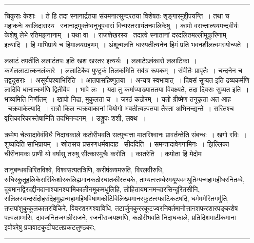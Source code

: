 \documentclass[11pt, openany]{book}
\begin{document}
\vspace{2mm}
\hrule

\noindent
{\s चिकुराः केशाः~। ते हि तदा स्नानार्द्रतया संयमनात्सुन्दरतया विशेषतः शृङ्गारमुद्दीपयन्ति~। तथा च महाकनेः कालिदासस्य \textendash\ {\qt स्नानाद्रमुक्तेष्वनुधूपवासं विन्यस्तसायंतनमलिकेषु}~। कामो वसन्तात्ययमन्दवीर्यः केशेषु लेभे रतिमझनानाम्~॥ यथा वा~। राजशेखरस्य \textendash\ {\qt तदात्वे स्नातानां दरदलितमल्लीमुकुरिणाम्} इत्यादि~। हि माभिप्राये च हिमालयग्रहणम्~। अंशून्मलति धारयतीत्यनेन हिमं प्रति भवनशीलत्वमस्योच्यते~।

ललाटं तपतीति ललाटंतपः इति खश खरतर इत्यर्थः~। ललाटेऽलंकारो ललाटिका~। {\qt कर्णललाटात्कनलंकारे}~। ललाटिकैव पुण्ट्रकं तिलकमिति सर्वत्र रूपकम्~। संवीतैः प्रावृतैः~। चन्दनेन च तद्वदूसराः~। {\qtt असूर्यपश्याभिरिति}~। आतपासहिष्णुतया~। अन्यत्र स्वभावात्~। दिवसं सुप्यत इति द्रव्यकर्मणि लादिवि धानात्कर्मणि द्वितीयैव~। भावे लः~। यदा तु कर्माप्याख्याततया विवक्ष्यते, तदा दिवसः सुप्यत इति~। भाव्यमिति निर्णीतम्~। खापो निद्रा, मुकुलता च~। जरठं कठोरम्~। यतो ग्रीष्मेण तनूकृता अत आह \textendash\ {\qtt चक्रवाकेत्यादि}~। रात्रौ किल न्वक्रवाकानां वियोगो भवतीत्यल्पतया तैस्ता अभिनन्द्यन्ते~। सरितश्च वृत्तिकारिकास्तेषामिति तदभिनन्दनम्~। उड्डुपः शशी, लवथ~।

क्रमेण चेत्यादावेवंविधै निदाघकाले कठोरीभवति सत्युन्मत्ता मातरिश्वानः प्रावर्तन्तेति संबन्धः~। खगो रविः~। शुष्यदिति साभिप्रायम्~। स्रोतसच प्रसरणधर्मवादाह \textendash\ {\qtt सीददिति}~। समन्तादावेगगामिनः~। झिल्लिका चीरीनामकः प्राणी यो वर्षासु तरुषु सीत्कारमुचैः करोति~। {\qtt कातरेति}~। कपोता हि मेदोम\textendash}

\newpage

\begin{sloppypar}
\noindent
तानुबन्धबधिरितविश्वे, विश्वसत्पतत्रिणि, करीषंकषमरुति, विरलवीरुधि, रुघिरकुतूहलिकेसरिकिशोरकलिह्यमानकठोरघातकीस्तबके, ताम्यत्स्तम्बेरमयूथवमथुतिम्यन्महामहीधरनितम्बे, दूयमानद्विरदद्दीनदानाश्यानश्यामिकालीनमूकमधुलिहि, लोहितायमानमन्दारसिन्दूरितसीनि, सलिलस्यन्दसंदोहसंदेहमुह्यन्महामहिषविषाणकोटिविलिख्यमानस्फुटत्स्फाटिकटषदि, धर्मममेरितगर्मुति, तप्तपांशुकुकूलकातरविकिरे, विवरशरणश्वाविधि, तटार्जुनकुररकूटज्वरनिवर्तमानोत्तानशफरशारपङ्कशेष पल्वलाम्भसि, दावजनितजगन्नीराजने, रजनीराजयक्ष्मणि, कठोरीभवति निदाघकाले, प्रतिदिशमाटीकमाना इवोषरेषु प्रपावाटकुटीपटलप्रकटलुण्ठकाः,
\end{sloppypar}

\vspace{2mm}
\hrule
\end{document}
